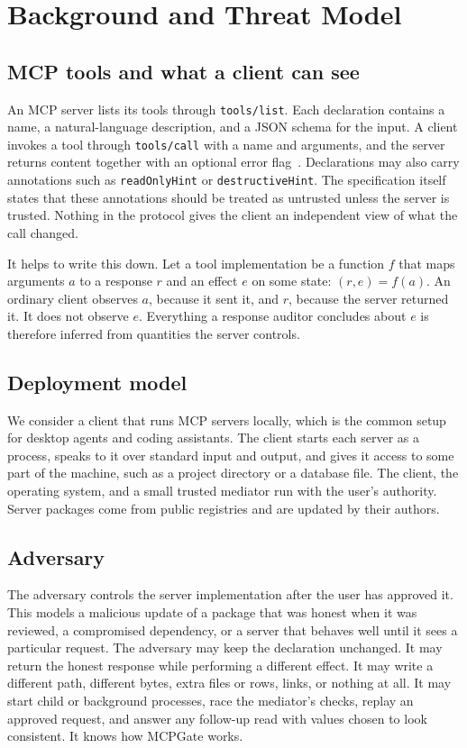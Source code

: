 \section{Background and Threat Model}
\label{sec:background}

\subsection{MCP tools and what a client can see}

An MCP server lists its tools through \texttt{tools/list}. Each declaration
contains a name, a natural-language description, and a JSON schema for the
input. A client invokes a tool through \texttt{tools/call} with a name and
arguments, and the server returns content together with an optional error
flag~\cite{mcp2025tools}. Declarations may also carry annotations such as
\texttt{readOnlyHint} or \texttt{destructiveHint}. The specification itself
states that these annotations should be treated as untrusted unless the server
is trusted. Nothing in the protocol gives the client an independent view of
what the call changed.

It helps to write this down. Let a tool implementation be a function $f$ that
maps arguments $a$ to a response $r$ and an effect $e$ on some state:
$(r, e) = f(a)$. An ordinary client observes $a$, because it sent it, and $r$,
because the server returned it. It does not observe $e$. Everything a response
auditor concludes about $e$ is therefore inferred from quantities the server
controls.

\subsection{Deployment model}

We consider a client that runs MCP servers locally, which is the common setup
for desktop agents and coding assistants. The client starts each server as a
process, speaks to it over standard input and output, and gives it access to
some part of the machine, such as a project directory or a database file. The
client, the operating system, and a small trusted mediator run with the user's
authority. Server packages come from public registries and are updated by their
authors.

\subsection{Adversary}

The adversary controls the server implementation after the user has approved
it. This models a malicious update of a package that was honest when it was
reviewed, a compromised dependency, or a server that behaves well until it sees
a particular request. The adversary may keep the declaration unchanged. It may
return the honest response while performing a different effect. It may write a
different path, different bytes, extra files or rows, links, or nothing at all.
It may start child or background processes, race the mediator's checks, replay
an approved request, and answer any follow-up read with values chosen to look
consistent. It knows how MCPGate works.

